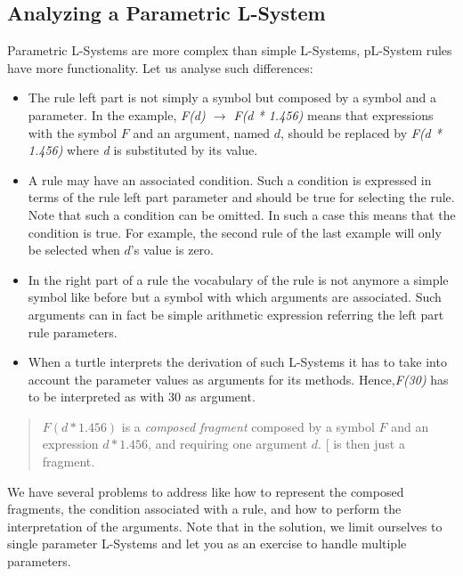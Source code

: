 \subsection{Analyzing a Parametric L-System}
Parametric L-Systems are more complex than simple L-Systems, pL-System
rules have more functionality. Let us analyse such differences:

\begin{itemize}
\item The rule left part is not simply a symbol but composed by a 
symbol and a parameter. In the example, \emph{F(d) $\rightarrow$ F(d *
1.456)} means that expressions with the symbol $F$ and an argument,
named $d$, should be replaced by \emph{F(d * 1.456)} where \emph{d} is
substituted by its value.

\item A rule may have an associated condition. Such a condition is 
expressed in terms of the rule left part parameter and should be true
for selecting the rule. Note that such a condition can be omitted. In
such a case this means that the condition is true. For example, the
second rule of the last example will only be selected when $d$'s value
is zero.

\item In the right part of a rule the vocabulary of the rule 
is not anymore a simple symbol like before but a symbol with which
arguments are associated.  Such arguments can in fact be simple
arithmetic expression referring the left part rule parameters. 

\item When a turtle interprets the derivation of such L-Systems it has 
to take into account the parameter values as arguments for its
methods. Hence,\emph{F(30)} has to be interpreted as \go with 30 as
argument.
\end{itemize}


\begin{quote}$F(d * 1.456)$ is a \emph{composed fragment} composed by a symbol $F$
and an expression $d * 1.456$, and requiring one argument $d$. $[$ is
then just a fragment.
\end{quote}


We have several problems to address like how to represent the composed
fragments, the condition associated with a rule, and how to perform
the interpretation of the arguments.  Note that in the solution, we
limit ourselves to single parameter L-Systems and let you as an
exercise to handle multiple parameters.


